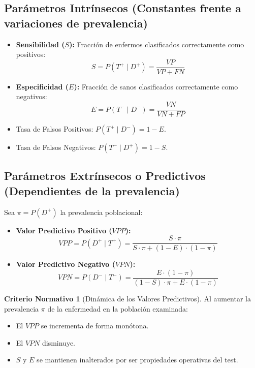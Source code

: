 \documentclass[11pt,a4paper]{report}
\theoremstyle{definition}
\newtheorem{criterio}{Criterio Normativo}[chapter]
\begin{document}
\subsection{Parámetros Intrínsecos (Constantes frente a variaciones de prevalencia)}
\begin{itemize}[leftmargin=*]
    \item \textbf{Sensibilidad ($S$):} Fracción de enfermos clasificados correctamente como positivos:
    \begin{equation}
    S = P(T^+ \mid D^+) = \frac{VP}{VP + FN}
    \end{equation}
    \item \textbf{Especificidad ($E$):} Fracción de sanos clasificados correctamente como negativos:
    \begin{equation}
    E = P(T^- \mid D^-) = \frac{VN}{VN + FP}
    \end{equation}
    \item Tasa de Falsos Positivos: $P(T^+ \mid D^-) = 1 - E$.
    \item Tasa de Falsos Negativos: $P(T^- \mid D^+) = 1 - S$.
\end{itemize}

\subsection{Parámetros Extrínsecos o Predictivos (Dependientes de la prevalencia)}
Sea $\pi = P(D^+)$ la prevalencia poblacional:
\begin{itemize}[leftmargin=*]
    \item \textbf{Valor Predictivo Positivo ($VPP$):}
    \begin{equation}
    VPP = P(D^+ \mid T^+) = \frac{S \cdot \pi}{S \cdot \pi + (1 - E) \cdot (1 - \pi)}
    \end{equation}
    \item \textbf{Valor Predictivo Negativo ($VPN$):}
    \begin{equation}
    VPN = P(D^- \mid T^-) = \frac{E \cdot (1 - \pi)}{(1 - S) \cdot \pi + E \cdot (1 - \pi)}
    \end{equation}
\end{itemize}

\begin{criterio}[Dinámica de los Valores Predictivos]
Al aumentar la prevalencia $\pi$ de la enfermedad en la población examinada:
\begin{itemize}
    \item El $VPP$ se incrementa de forma monótona.
    \item El $VPN$ disminuye.
    \item $S$ y $E$ se mantienen inalterados por ser propiedades operativas del test.
\end{itemize}
\end{criterio}
\end{document}
